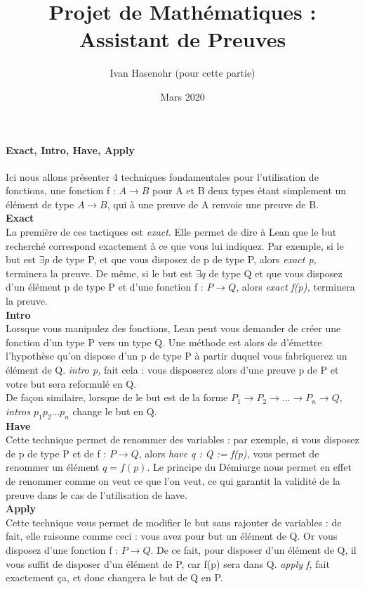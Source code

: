 \documentclass[french,frenchkw]{article}
\title{Projet de Mathématiques : Assistant de Preuves}
\author{Ivan Hasenohr (pour cette partie)}
\date{Mars 2020}
\begin{document}
\maketitle
\paragraph{Exact, Intro, Have, Apply}
Ici nous allons présenter 4 techniques fondamentales pour l'utilisation de fonctions, une fonction f : $A\to B$ pour A et B deux types étant simplement un élément de type $A\to B$, qui à une preuve de A renvoie une preuve de B.\\
\textbf{Exact}\\
La première de ces tactiques est \textit{exact}. Elle permet de dire à Lean que le but recherché correspond exactement à ce que vous lui indiquez. Par exemple, si le but est  $\exists  p$ de type P, et que vous disposez de p de type P, alors \textit{exact p,} terminera la preuve. De même, si le but est  $\exists  q$ de type Q et que vous disposez d'un élément p de type P et d'une fonction f : $P \to Q$, alors \textit{exact f(p),} terminera la preuve.\\
\textbf{Intro} \\
Lorsque vous manipulez des fonctions, Lean peut vous demander de créer une fonction d'un type P vers un type Q. Une méthode est alors de d'émettre l'hypothèse qu'on dispose d'un p de type P à partir duquel vous fabriquerez un élément de Q. \textit{intro p,} fait cela : vous disposerez alors d'une preuve p de P et votre but sera reformulé en Q. \\
De façon similaire, lorsque de le but est de la forme $P_1 \to P_2 \to ... \to P_n \to Q$, \textit{intros $p_1 p_2 ... p_n$} change le but en Q.\\
\textbf{Have} \\
Cette technique permet de renommer des variables : par exemple, si vous disposez de p de type P et de f : $P \to Q$, alors \textit{have q : Q := f(p),} vous permet de renommer un élément $q = f(p)$. Le principe du Démiurge nous permet en effet de renommer comme on veut ce que l'on veut, ce qui garantit la validité de la preuve dans le cas de l'utilisation de have. \\
\textbf{Apply}\\
Cette technique vous permet de modifier le but sans rajouter de variables : de fait, elle raisonne comme ceci : vous avez pour but un élément de Q. Or vous disposez d'une fonction f : $P \to Q$. De ce fait, pour disposer d'un élément de Q, il vous suffit de disposer d'un élément de P, car f(p) sera dans Q. \textit{apply f,} fait exactement ça, et donc changera le but de Q en P.\\
\end{document}
